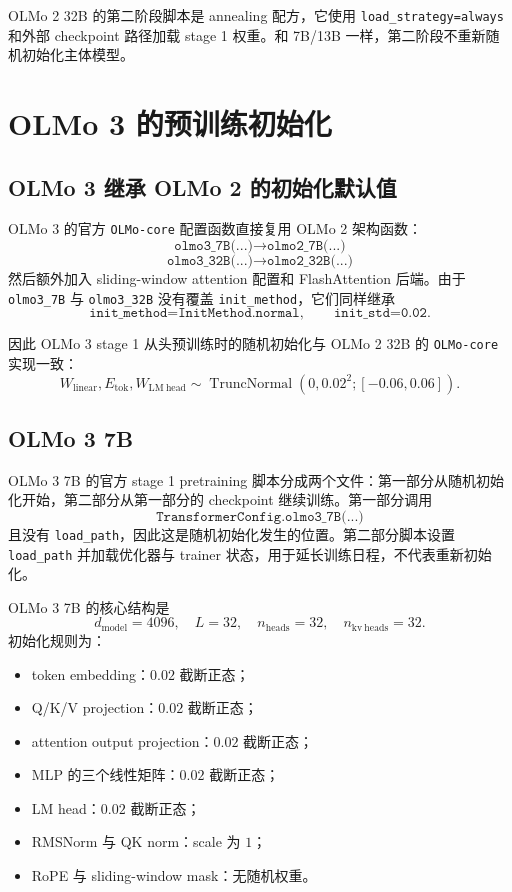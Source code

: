 \documentclass[UTF8,a4paper,11pt]{ctexart}
\newcommand{\TruncNormal}{\operatorname{TruncNormal}}
\begin{document}
OLMo 2 32B 的第二阶段脚本是 annealing 配方，它使用 \texttt{load\_strategy=always} 和外部 checkpoint 路径加载 stage 1 权重。和 7B/13B 一样，第二阶段不重新随机初始化主体模型。

\section{OLMo 3 的预训练初始化}

\subsection{OLMo 3 继承 OLMo 2 的初始化默认值}

OLMo 3 的官方 \texttt{OLMo-core} 配置函数直接复用 OLMo 2 架构函数：
\[
  \texttt{olmo3\_7B(...)} \rightarrow \texttt{olmo2\_7B(...)}
\]
\[
  \texttt{olmo3\_32B(...)} \rightarrow \texttt{olmo2\_32B(...)}
\]
然后额外加入 sliding-window attention 配置和 FlashAttention 后端。由于 \texttt{olmo3\_7B} 与 \texttt{olmo3\_32B} 没有覆盖 \texttt{init\_method}，它们同样继承
\[
  \texttt{init\_method=InitMethod.normal},\qquad
  \texttt{init\_std=0.02}.
\]

因此 OLMo 3 stage 1 从头预训练时的随机初始化与 OLMo 2 32B 的 \texttt{OLMo-core} 实现一致：
\[
  W_{\mathrm{linear}},E_{\mathrm{tok}},W_{\mathrm{LM\ head}}
  \sim
  \TruncNormal(0,0.02^2;[-0.06,0.06]).
\]

\subsection{OLMo 3 7B}

OLMo 3 7B 的官方 stage 1 pretraining 脚本分成两个文件：第一部分从随机初始化开始，第二部分从第一部分的 checkpoint 继续训练。第一部分调用
\[
  \texttt{TransformerConfig.olmo3\_7B(...)}
\]
且没有 \texttt{load\_path}，因此这是随机初始化发生的位置。第二部分脚本设置 \texttt{load\_path} 并加载优化器与 trainer 状态，用于延长训练日程，不代表重新初始化。

OLMo 3 7B 的核心结构是
\[
  d_{\mathrm{model}}=4096,\quad L=32,\quad n_{\mathrm{heads}}=32,\quad n_{\mathrm{kv\ heads}}=32.
\]
初始化规则为：

\begin{itemize}
  \item token embedding：$0.02$ 截断正态；
  \item Q/K/V projection：$0.02$ 截断正态；
  \item attention output projection：$0.02$ 截断正态；
  \item MLP 的三个线性矩阵：$0.02$ 截断正态；
  \item LM head：$0.02$ 截断正态；
  \item RMSNorm 与 QK norm：scale 为 $1$；
  \item RoPE 与 sliding-window mask：无随机权重。
\end{itemize}
\end{document}
